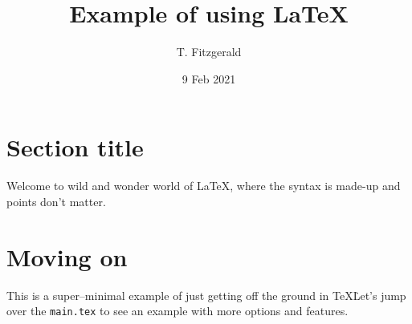 \documentclass[letterpaper,10pt,twoside]{article}
\title{Example of using \LaTeX}
\date{9 Feb 2021}
\author{T. Fitzgerald}
\begin{document}
\maketitle

\section{Section title}
Welcome to wild and wonder world of \LaTeX , where the syntax is made-up and points don't matter.

\section{Moving on}
This is a super--minimal example of just getting off the ground in \TeX\.  
Let's jump over the \texttt{main.tex} to see an example with more options and features. 
\end{document}
